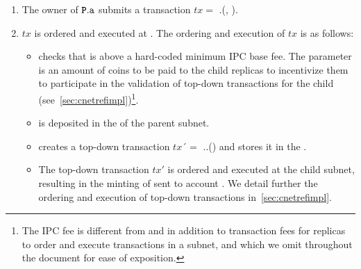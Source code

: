 \begin{enumerate}
    \item The owner of $\textbf{\texttt{P}}.\texttt{a}$ submits a transaction $tx=$ \gw.(, ).
    \item $tx$ is ordered and executed at . The ordering and execution of $tx$ is as follows:
    \begin{itemize}
        \item \gw checks that  is above a hard-coded minimum IPC base fee. The parameter  is an amount of coins to be paid to the child replicas to incentivize them to participate in the validation of top-down transactions for the child (see~\cref{sec:cnetrefimpl})\footnote{The IPC fee is different from and in addition to transaction fees for replicas to order and execute transactions in a subnet, and which we omit throughout the document for ease of exposition.}. 
        \item {} is deposited in the \gw of the parent subnet.
        \item \gw creates a top-down transaction $tx´=$ .\gw.() and stores it in the \tqueue.
        \item The top-down transaction $tx'$ is ordered and executed at the child subnet, resulting in the minting of  sent to account . We detail further the ordering and execution of top-down transactions in~\cref{sec:cnetrefimpl}.
    \end{itemize}
\end{enumerate}

